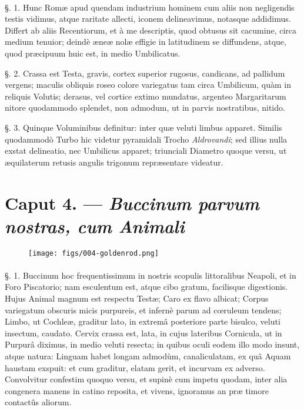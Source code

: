 \documentclass[a4paper, 11pt, oneside, polutonikogreek, german]{article}
\begin{document}
\paragraph{}
§. 1. Hunc Romæ apud quendam industrium hominem cum aliis non negligendis testis vidimus, atque raritate allecti, iconem delineavimus, notasque addidimus. Differt ab aliis Recentiorum, et à me descriptis, quod obtusus sit cacumine, circa medium tenuior; deindè æneæ nolæ effigie in latitudinem se diffundens, atque, quod præcipuum huic est, in medio Umbilicatus.

§. 2. Crassa est Testa, gravis, cortex superior rugosus, candicans, ad pallidum vergens; maculis obliquis roseo colore variegatus tam circa Umbilicum, quàm in reliquis Volutis; derasus, vel cortice extimo mundatus, argenteo Margaritarum nitore quodammodo splendet, non admodum, ut in parvis nostratibus, nitido.

§. 3. Quinque Voluminibus definitur: inter quæ veluti limbus apparet. Similis quodammodò Turbo hic videtur pyramidali Trocho \emph{Aldrovandi}; sed illius nulla exstat delineatio, nec Umbilicus apparet; triunciali Diametro quoque versu, ut æquilaterum retusis angulis trigonum repræsentare videatur.

\section{Caput 4. --- \emph{Buccinum parvum nostras, cum Animali}}
\begin{figure}[H]
\centering
\texttt{[image: figs/004-goldenrod.png]}

\end{figure}
\paragraph{}
§. 1. Buccinum hoc frequentissimum in nostris scopulis littoralibus Neapoli, et in Foro Piscatorio; nam esculentum est, atque cibo gratum, facilisque digestionis. Hujus Animal magnum est respectu Testæ; Caro ex flavo albicat; Corpus variegatum obscuris micis purpureis, et infernè parum ad cœruleum tendens; Limbo, ut Cochleæ, graditur lato, in extremâ posteriore parte bisulco, veluti insectum, caudato. Cervix crassa est, lata, in cujus lateribus Cornicula, ut in Purpurâ diximus, in medio veluti resecta; in quibus oculi eodem illo modo insunt, atque natura: Linguam habet longam admodùm, canaliculatam, ex quâ Aquam haustam exspuit: et cum graditur, elatam gerit, et incurvam ex adverso. Convolvitur confestim quoquo versu, et supinè cum impetu quodam, inter alia congenera manens in catino reposita, et vivens, ignoramus an præ timore contactûs aliorum.
\end{document}
